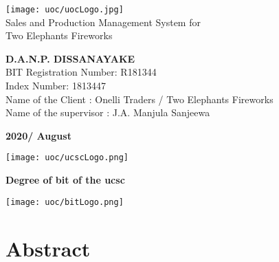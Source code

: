 \documentclass[12pt]{report}
\begin{document}
\onehalfspacing

\setlength{\parindent}{3em} %
\setlength{\parskip}{1em} %

\thispagestyle{empty}
\begin{titlepage}
	\begin{center}
		\vspace*{2cm}
		\texttt{[image: uoc/uocLogo.jpg]}\\
		\vspace{1cm}
		{\LARGE Sales and Production Management System for \\Two Elephants Fireworks}
		\vspace{2cm}
		\begin{large}

			\textbf{D.A.N.P. DISSANAYAKE}\\
			\vspace{2cm}
			BIT Registration Number: R181344 \\
			Index Number: 1813447 \\
			Name of the Client :  Onelli Traders / Two Elephants Fireworks \\
			Name of the supervisor :  J.A. Manjula Sanjeewa \\

			\vspace{1cm}

			\bf{2020/ August}

			\vspace{2.5cm}

			\vfill


			\texttt{[image: uoc/ucscLogo.png]}%
			\begin{minipage}[b]{0.7\textwidth}
				\centering
				{\small \bf Degree of \acrlong{bit} of the \acrlong{ucsc}}
			\end{minipage}%
			\texttt{[image: uoc/bitLogo.png]}
		\end{large}
	\end{center}
\end{titlepage}


\newpage
\thispagestyle{plain}
\setcounter{page}{2}
\chapter*{\Huge Abstract}
\end{document}
